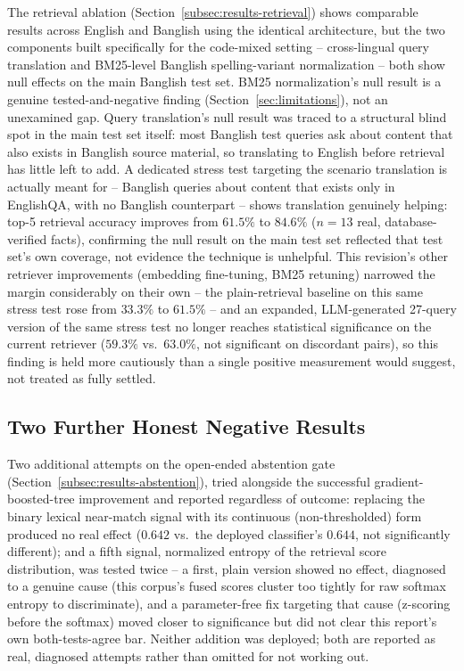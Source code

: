\documentclass[a4paper,twoside]{article}
\begin{document}
The retrieval ablation (Section~\ref{subsec:results-retrieval}) shows comparable results across English and Banglish using the identical architecture, but the two components built specifically for the code-mixed setting -- cross-lingual query translation and BM25-level Banglish spelling-variant normalization -- both show null effects on the main Banglish test set. BM25 normalization's null result is a genuine tested-and-negative finding (Section~\ref{sec:limitations}), not an unexamined gap. Query translation's null result was traced to a structural blind spot in the main test set itself: most Banglish test queries ask about content that also exists in Banglish source material, so translating to English before retrieval has little left to add. A dedicated stress test targeting the scenario translation is actually meant for -- Banglish queries about content that exists only in EnglishQA, with no Banglish counterpart -- shows translation genuinely helping: top-5 retrieval accuracy improves from $61.5\%$ to $84.6\%$ ($n=13$ real, database-verified facts), confirming the null result on the main test set reflected that test set's own coverage, not evidence the technique is unhelpful. This revision's other retriever improvements (embedding fine-tuning, BM25 retuning) narrowed the margin considerably on their own -- the plain-retrieval baseline on this same stress test rose from $33.3\%$ to $61.5\%$ -- and an expanded, LLM-generated 27-query version of the same stress test no longer reaches statistical significance on the current retriever ($59.3\%$ vs.\ $63.0\%$, not significant on discordant pairs), so this finding is held more cautiously than a single positive measurement would suggest, not treated as fully settled.

\subsection{Two Further Honest Negative Results}
\label{subsec:results-further-negatives}

Two additional attempts on the open-ended abstention gate (Section~\ref{subsec:results-abstention}), tried alongside the successful gradient-boosted-tree improvement and reported regardless of outcome: replacing the binary lexical near-match signal with its continuous (non-thresholded) form produced no real effect ($0.642$ vs.\ the deployed classifier's $0.644$, not significantly different); and a fifth signal, normalized entropy of the retrieval score distribution, was tested twice -- a first, plain version showed no effect, diagnosed to a genuine cause (this corpus's fused scores cluster too tightly for raw softmax entropy to discriminate), and a parameter-free fix targeting that cause (z-scoring before the softmax) moved closer to significance but did not clear this report's own both-tests-agree bar. Neither addition was deployed; both are reported as real, diagnosed attempts rather than omitted for not working out.
\end{document}
